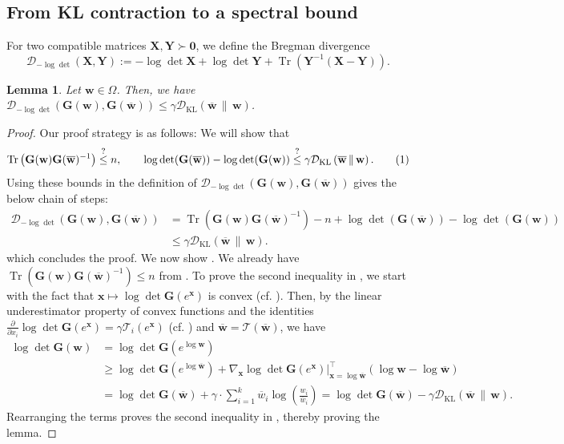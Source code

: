 \documentclass[11pt]{article}
\newcommand\numberthis{\addtocounter{equation}{1}\tag{\theequation}}
\theoremstyle{plain}
\newtheorem{lemma}[lemma]{Lemma}
\numberwithin{equation}{section}
\newcommand{\Tr}{\operatorname{Tr}}
\newcommand{\bG}{\mathbf{G}}
\newcommand{\bX}{\mathbf{X}}
\newcommand{\bY}{\mathbf{Y}}
\newcommand{\bzero}{\mathbf{0}}
\newcommand{\bw}{\mathbf{w}}
\newcommand{\bx}{\mathbf{x}}
\newcommand{\bwbar}{\overline{\mathbf{w}}}
\newcommand{\wbar}{\overline{w}}
\newcommand{\calT}{\mathcal{T}}
\newcommand{\omrp}{\gamma}
\newcommand{\kldiv}[2]{\mathcal{D}_{\mathrm{KL}}\left(#1 \,\|\, #2\right)}
\newcommand{\logdetdiv}[2]{\mathcal{D}_{-\log\det}\left(#1, #2\right)}
\begin{document}
\subsection{From KL contraction to a spectral bound}
\label{sec:coordinate-wise-control}
 For two compatible matrices $\bX, \bY\succ\bzero$, we define the Bregman divergence~\cite{bregman1967relaxation} \[\logdetdiv{\bX}{\bY}:= -\log\det\bX+\log\det\bY + \Tr\left(\bY^{-1}\left(\bX-\bY\right)\right).\] 
\begin{lemma}\label{lem:normalized-gram-eigs-small}
Let $\bw\in \Omega$. Then, 
 we have $\logdetdiv{\bG(\bw)}{\bG(\bwbar)} \leq \omrp\kldiv{\bwbar}{\bw}$. 
\end{lemma}
\begin{proof}
Our proof strategy is as follows: We will show that \[\Tr\left(\bG(\bw)\bG(\bwbar)^{-1}\right)\stackrel{?}{\leq} n, \qquad \log\det(\bG(\bwbar)) - \log\det(\bG(\bw)) \stackrel{?}{\leq}\omrp\kldiv{\bwbar}{\bw}.\numberthis\label{eq:spectral-1}\] Using these bounds in the definition of $\logdetdiv{\bG(\bw)}{\bG(\bwbar)}$ gives the below chain of steps: \begin{align*}\logdetdiv{\bG(\bw)}{\bG(\bwbar)} &= \Tr\left(\bG(\bw)\bG(\bwbar)^{-1}\right) - n + \log\det(\bG(\bwbar)) - \log\det(\bG(\bw))\\ & \leq \omrp\kldiv{\bwbar}{\bw}.\end{align*} which  concludes the proof. We now show . We already have  $\Tr\left(\bG(\bw)\bG(\bwbar)^{-1}\right)\leq n$  from . To prove the second inequality in , we start with the fact that $\bx\mapsto\log\det\bG(e^{\bx})$ is convex (cf. ). Then, by the linear underestimator property of convex functions and the identities $\frac{\partial}{\partial x_i}\log\det\bG\left(e^{\bx}\right) = \omrp \calT_{i}\left(e^{\bx}\right)$ (cf. ) and $\bwbar=\calT(\bwbar)$,  we have \begin{align*}
\log\det\bG(\bw) &= \log\det\bG\left(e^{\log \bw}\right)\\ &\geq \log\det\bG\left(e^{\log \bwbar}\right) + \nabla_{\bx}\log\det\bG\left(e^{\bx}\right)|_{\bx=\log\bwbar}^\top (\log \bw-\log\bwbar)\\  
&= \log\det\bG(\bwbar) + \omrp\cdot \sum_{i = 1}^k \wbar_i \log\left(\frac{w_i}{\wbar_i}\right) = \log\det\bG(\bwbar) - \omrp \kldiv{\bwbar}{\bw}. 
\end{align*} Rearranging the terms  proves the second inequality in , thereby proving the lemma. 
\end{proof}
\end{document}
